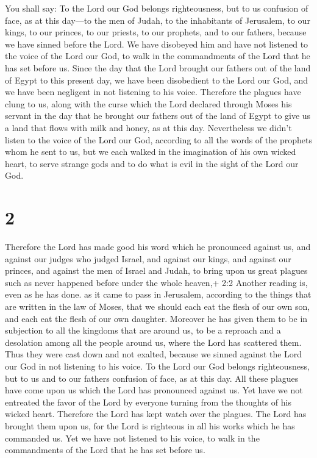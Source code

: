  You shall say: To the Lord our God belongs righteousness,
but to us confusion of face, as at this day---to the men of Judah, to
the inhabitants of Jerusalem,  to our kings, to our
princes, to our priests, to our prophets, and to our fathers,
 because we have sinned before the Lord.  We
have disobeyed him and have not listened to the voice of the Lord our
God, to walk in the commandments of the Lord that he has set before us.
 Since the day that the Lord brought our fathers out of the
land of Egypt to this present day, we have been disobedient to the Lord
our God, and we have been negligent in not listening to his voice.
 Therefore the plagues have clung to us, along with the
curse which the Lord declared through Moses his servant in the day that
he brought our fathers out of the land of Egypt to give us a land that
flows with milk and honey, as at this day.  Nevertheless we
didn't listen to the voice of the Lord our God, according to all the
words of the prophets whom he sent to us,  but we each
walked in the imagination of his own wicked heart, to serve strange gods
and to do what is evil in the sight of the Lord our God.

\hypertarget{section-1}{%
\section{2}\label{section-1}}

 Therefore the Lord has made good his word which he
pronounced against us, and against our judges who judged Israel, and
against our kings, and against our princes, and against the men of
Israel and Judah,  to bring upon us great plagues such as
never happened before under the whole heaven,+ 2:2 Another reading is,
even as he has done. as it came to pass in Jerusalem, according to the
things that are written in the law of Moses,  that we should
each eat the flesh of our own son, and each eat the flesh of our own
daughter.  Moreover he has given them to be in subjection to
all the kingdoms that are around us, to be a reproach and a desolation
among all the people around us, where the Lord has scattered them.
 Thus they were cast down and not exalted, because we sinned
against the Lord our God in not listening to his voice.  To
the Lord our God belongs righteousness, but to us and to our fathers
confusion of face, as at this day.  All these plagues have
come upon us which the Lord has pronounced against us.  Yet
have we not entreated the favor of the Lord by everyone turning from the
thoughts of his wicked heart.  Therefore the Lord has kept
watch over the plagues. The Lord has brought them upon us, for the Lord
is righteous in all his works which he has commanded us. 
Yet we have not listened to his voice, to walk in the commandments of
the Lord that he has set before us.


